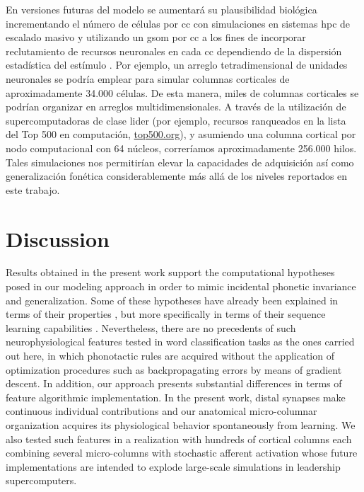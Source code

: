 {En versiones futuras del modelo se aumentará su plausibilidad biológica incrementando el número de células por \gls{cc} con simulaciones en sistemas \gls{hpc} de escalado masivo y utilizando un \gls{gsom} por \gls{cc} a los fines de incorporar reclutamiento de recursos neuronales en cada \gls{cc} dependiendo de la dispersión estadística del estímulo \cite{Meyer19113}. Por ejemplo, un arreglo tetradimensional de unidades neuronales se podría emplear para simular columnas corticales de aproximadamente 34.000 células. De esta manera, miles de columnas corticales se podrían organizar en arreglos multidimensionales. A través de la utilización de supercomputadoras de clase lider (por ejemplo, recursos ranqueados en la lista del Top 500 en computación, \url{top500.org}), y asumiendo una columna cortical por nodo computacional con 64 núcleos, correríamos aproximadamente 256.000 hilos. Tales simulaciones nos permitirían elevar la capacidades de adquisición así como generalización fonética considerablemente más allá de los niveles reportados en este trabajo.
}{
\section{Discussion}

Results obtained in the present work support the computational hypotheses posed in our modeling approach in order to mimic incidental phonetic invariance and generalization.
Some of these hypotheses have already been explained in terms of their properties \cite{hawkins_2016}, but more specifically in terms of their sequence learning capabilities \cite{cui_2016}.
Nevertheless, there are no precedents of such neurophysiological features tested in word classification tasks as the ones carried out here, in which phonotactic rules are acquired without the application of optimization procedures such as backpropagating errors by means of gradient descent. In addition, our approach presents substantial differences in terms of feature algorithmic implementation. In the present work, distal synapses make continuous individual contributions and our anatomical micro-columnar organization acquires its physiological behavior spontaneously from learning. We also tested such features in a realization with hundreds of cortical columns each combining several micro-columns with stochastic afferent activation whose future implementations are intended to explode large-scale simulations in leadership supercomputers.

}
